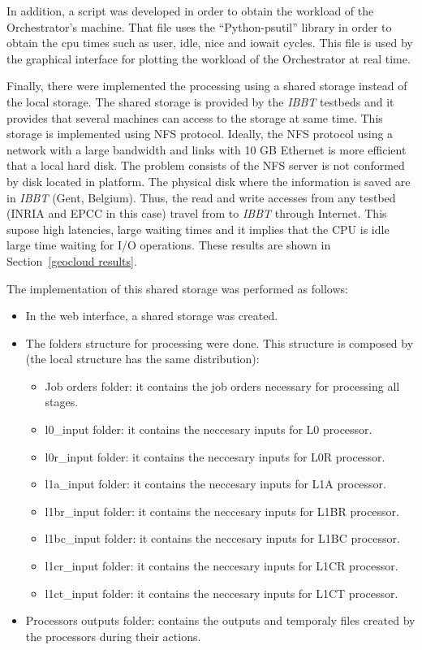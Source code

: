 In addition, a script was developed in order to obtain the workload of the
Orchestrator's machine. That file uses the ``Python-psutil'' library in order to
obtain the cpu times such as user, idle, nice and iowait cycles. This file is
used by the graphical interface for plotting the workload of the Orchestrator at
real time.

Finally, there were implemented the processing using a shared storage instead of
the local storage. The shared storage is provided by the \emph{IBBT} testbeds
and it provides that several machines can access to the storage at same
time. This storage is implemented using \ac{NFS} protocol. Ideally, the \ac{NFS}
protocol using a network with a large bandwidth and links with 10 GB Ethernet is
more efficient that a local hard disk. The problem consists of the \ac{NFS}
server is not conformed by disk located in \bonfire platform. The physical disk
where the information is saved are in \emph{IBBT} (Gent, Belgium). Thus, the
read and write accesses from any \bonfire testbed (INRIA and EPCC in this case)
travel from \bonfire to \emph{IBBT} through Internet. This supose high
latencies, large waiting times and it implies that the CPU is idle large time
waiting for I/O operations. These results are shown in Section~\ref{geocloud
  results}.

The implementation of this shared storage was performed as follows:
\begin{itemize}
\item In the \bonfire web interface, a shared storage was created. 
\item The folders structure for processing were done. This structure is composed
  by (the local structure has the same distribution): 
\begin{itemize}
\item Job orders folder: it contains the job orders necessary for processing all
  stages.
\item l0\_input folder: it contains the neccesary inputs for L0 processor. 
\item l0r\_input folder: it contains the neccesary inputs for L0R processor. 
\item l1a\_input folder: it contains the neccesary inputs for L1A processor. 
\item l1br\_input folder: it contains the neccesary inputs for L1BR processor. 
\item l1bc\_input folder: it contains the neccesary inputs for L1BC processor. 
\item l1cr\_input folder: it contains the neccesary inputs for L1CR processor. 
\item l1ct\_input folder: it contains the neccesary inputs for L1CT processor. 
\end{itemize}
\item Processors outputs folder: contains the outputs and temporaly files
  created by the processors during their actions.
\end{itemize}

